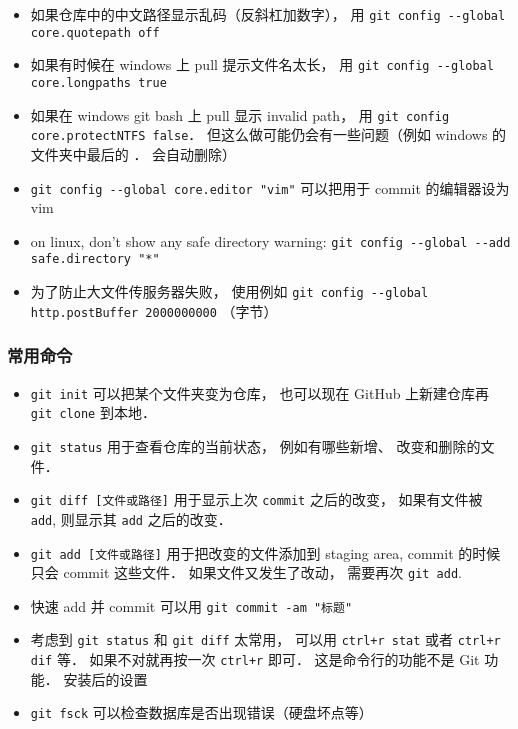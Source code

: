 \begin{itemize}
\item 如果仓库中的中文路径显示乱码（反斜杠加数字）， 用 \verb|git config --global core.quotepath off|
\item 如果有时候在 windows 上 pull 提示文件名太长， 用 \verb|git config --global core.longpaths true|
\item 如果在 windows git bash 上 pull 显示 invalid path， 用 \verb|git config core.protectNTFS false|． 但这么做可能仍会有一些问题（例如 windows 的文件夹中最后的 ． 会自动删除）
\item \verb|git config --global core.editor "vim"| 可以把用于 commit 的编辑器设为 vim
\item on linux, don't show any safe directory warning: \verb|git config --global --add safe.directory "*"|
\item 为了防止大文件传服务器失败， 使用例如 \verb|git config --global http.postBuffer 2000000000| （字节）
\end{itemize}

\subsubsection{常用命令}
\begin{itemize}
\item \verb|git init| 可以把某个文件夹变为仓库， 也可以现在 GitHub 上新建仓库再 \verb|git clone| 到本地．
\item \verb|git status| 用于查看仓库的当前状态， 例如有哪些新增、 改变和删除的文件．
\item \verb|git diff [文件或路径]| 用于显示上次 \verb|commit| 之后的改变， 如果有文件被 \verb|add|, 则显示其 \verb|add| 之后的改变．
\item \verb|git add [文件或路径]| 用于把改变的文件添加到 staging area, commit 的时候只会 commit 这些文件． 如果文件又发生了改动， 需要再次 \verb|git add|.
\item 快速 add 并 commit 可以用 \verb|git commit -am "标题"|
\item 考虑到 \verb|git status| 和 \verb|git diff| 太常用， 可以用 \verb|ctrl+r stat| 或者 \verb|ctrl+r dif| 等． 如果不对就再按一次 \verb|ctrl+r| 即可． 这是命令行的功能不是 Git 功能．
安装后的设置
\item \verb|git fsck| 可以检查数据库是否出现错误（硬盘坏点等）
\end{itemize}

